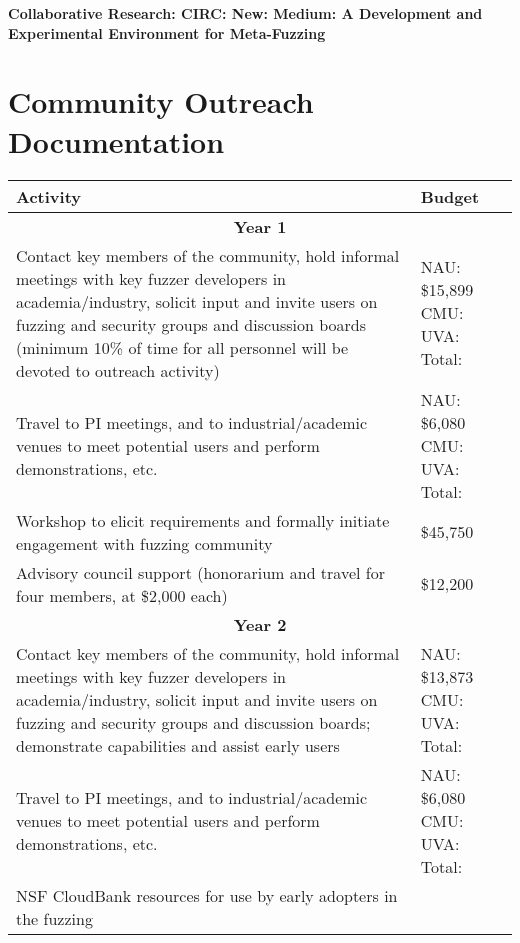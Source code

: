 \documentclass[12pt]{article}
\begin{document}
\begin{center} {\Large\sf\textbf{Collaborative Research: CIRC: New: Medium: A
      Development and Experimental Environment for Meta-Fuzzing}}
\end{center}

\section*{Community Outreach Documentation}


\begin{table}
  \begin{tabular}{|p{12cm}|p{3cm}|}
    \hline
    {\bf Activity} & {\bf Budget} \\
    \hline 
    \multicolumn{2}{c}{{\bf Year 1}} \\
    \hline
    Contact key members of the community, hold informal meetings with
    key fuzzer developers in academia/industry, solicit input and
    invite users
    on fuzzing and security groups and discussion boards (minimum 10\% of time for all
    personnel will be devoted to outreach activity) &  NAU: \$15,899 CMU: UVA:
                                                      Total:  \\
    \hline
    Travel to PI meetings, and to industrial/academic venues to meet
    potential users and perform demonstrations, etc. & NAU: \$6,080 CMU: UVA: Total:\\
    \hline
    Workshop to elicit requirements and formally initiate engagement
    with fuzzing community & \$45,750 \\
    \hline 
    Advisory council support (honorarium and travel for four members, 
    at \$2,000 each) & \$12,200 \\
    \hline
    \hline
    \multicolumn{2}{c}{{\bf Year 2}} \\
    \hline
    \hline
    Contact key members of the community, hold informal meetings with
    key fuzzer developers in academia/industry, solicit input and
    invite users
    on fuzzing and security groups and discussion boards; demonstrate
    capabilities and assist early users&  NAU:  \$13,873 CMU: UVA:
                                                      Total:  \\
    \hline
    Travel to PI meetings, and to industrial/academic venues to meet
    potential users and perform demonstrations, etc. & NAU: \$6,080 CMU: UVA: Total:\\
    \hline
    NSF CloudBank resources for use by early adopters in the fuzzing 

\end{tabular}
\end{table}
\end{document}

